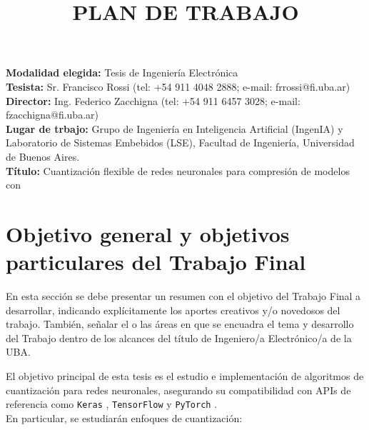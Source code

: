 \documentclass[a4paper,11pt, oneside]{article}
\title{PLAN DE TRABAJO}
\date{}
\begin{document}
\maketitle

\textbf{Modalidad elegida:} Tesis de Ingeniería Electrónica \\

\textbf{Tesista:} Sr. Francisco Rossi (tel: +54 911 4048 2888; e-mail: frrossi@fi.uba.ar) \\

\textbf{Director:} Ing. Federico Zacchigna (tel: +54 911 6457 3028; e-mail: fzacchigna@fi.uba.ar) \\

\textbf{Lugar de trbajo:}  Grupo de Ingeniería en Inteligencia Artificial (IngenIA) y Laboratorio de Sistemas Embebidos (LSE), Facultad de Ingeniería, Universidad de Buenos Aires. \\

\textbf{Título:} Cuantización flexible de redes neuronales para compresión de modelos con  \\

\section*{Objetivo general y objetivos particulares del Trabajo Final}

    {
        \color{gray}
        \scriptsize
        En esta sección se debe presentar un resumen con el objetivo del Trabajo Final a desarrollar, indicando explícitamente los aportes creativos y/o novedosos del trabajo. También, señalar el o las áreas en que se encuadra el tema y desarrollo del Trabajo dentro de los alcances del título de Ingeniero/a Electrónico/a de la UBA.\\
    }

El objetivo principal de esta tesis es el estudio e implementación de algoritmos de cuantización para redes neuronales, asegurando su compatibilidad con APIs de referencia como \texttt{Keras} \cite{keras}, \texttt{TensorFlow} \cite{tensorflow} y \texttt{PyTorch} \cite{pytorch}. \\

En particular, se estudiarán enfoques de cuantización: \\
\end{document}
